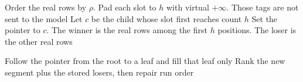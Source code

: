 \begin{algorithm}[H]
\caption{Replay one node. Slot 0 and slot 1 are arguments, not run ids.}
\label{alg:replay}
Order the real rows by $\rho$.
Pad each slot to $h$ with virtual $+\infty$.
Those tags are not sent to the model\;
Let $c$ be the child whose slot first reaches count $h$\;
Set the pointer to $c$.
The winner is the real rows among the first $h$ positions.
The loser is the other real rows\;
\end{algorithm}

\begin{algorithm}[H]
\caption{Refresh. Collect, rank, and write-back stay separate.}
\label{alg:refresh}
Follow the pointer from the root to a leaf and fill that leaf only\;
Rank the new segment plus the stored losers, then repair run order\;
\end{algorithm}
